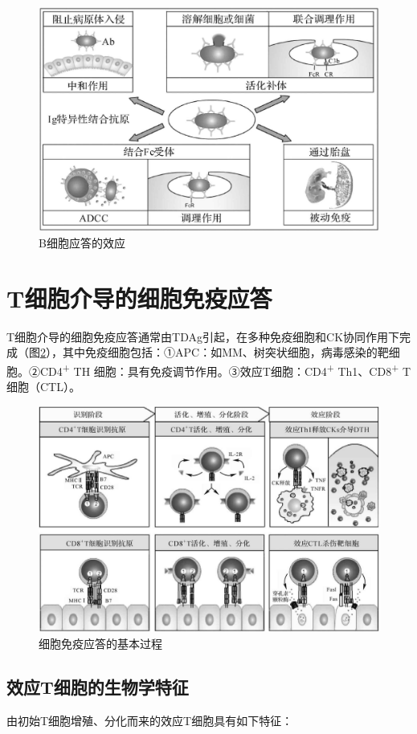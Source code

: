 \begin{figure}[!htbp]
 \centering
 \includegraphics[width=.6\textwidth]{./images/Image00147.jpg}
 \captionsetup{justification=centering}
 \caption{B细胞应答的效应}
 \label{fig9-21}
  \end{figure} 

\section{T细胞介导的细胞免疫应答}

T细胞介导的细胞免疫应答通常由TDAg引起，在多种免疫细胞和CK协同作用下完成（图\ref{fig9-22}），其中免疫细胞包括：①APC：如MM、树突状细胞，病毒感染的靶细胞。②CD4\textsuperscript{+}
TH 细胞：具有免疫调节作用。③效应T细胞：CD4\textsuperscript{+}
Th1、CD8\textsuperscript{+} T细胞（CTL）。

\begin{figure}[!htbp]
 \centering
 \includegraphics[width=.66\textwidth]{./images/Image00148.jpg}
 \captionsetup{justification=centering}
 \caption{细胞免疫应答的基本过程}
 \label{fig9-22}
  \end{figure} 


\subsection{效应T细胞的生物学特征}

由初始T细胞增殖、分化而来的效应T细胞具有如下特征：

